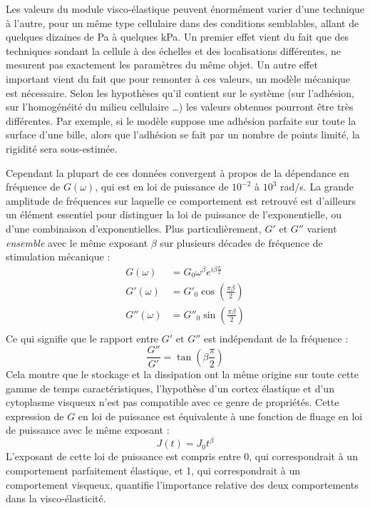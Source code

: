 \documentclass{report}
\begin{document}
Les valeurs du module visco-élastique peuvent énormément varier d'une technique à l'autre, pour un même type cellulaire dans des conditions semblables, allant de quelques dizaines de Pa à quelques kPa. 
Un premier effet vient du fait que des techniques sondant la cellule à des échelles et des localisations différentes, ne mesurent pas exactement les paramètres du même objet. 
Un autre effet important vient du fait que pour remonter à ces valeurs, un modèle mécanique est nécessaire. Selon les hypothèses qu'il contient sur le système (sur l'adhésion, sur l'homogénéité du milieu cellulaire \dots) les valeurs obtenues pourront être très différentes. 
Par exemple, si le modèle suppose une adhésion parfaite sur toute la surface d'une bille, alors que l'adhésion se fait par un nombre de points limité, la rigidité sera sous-estimée. 

Cependant la plupart de ces données convergent à propos de la dépendance en fréquence de $G(\omega)$, qui est en loi de puissance de $10^{-2}$ à $10^3$ rad/s. La grande amplitude de fréquences sur laquelle ce comportement est retrouvé est d'ailleurs un élément essentiel pour distinguer la loi de puissance de l'exponentielle, ou d'une combinaison d'exponentielles. Plus particulièrement, $G'$ et $G''$ varient \emph{ensemble} avec le même exposant $\beta$ sur plusieurs décades de fréquence de stimulation mécanique : 
\begin{align}
G(\omega)&=G_0 \omega^{\beta} e^{i \beta \frac{\pi}{2}} \\
G'(\omega)&=G'_0 \cos \left( \frac{\pi \beta}{2} \right) \\
G''( \omega)&=G''_0 \sin \left( \frac{\pi \beta}{2} \right) \\
\end{align} 
Ce qui signifie que le rapport entre $G'$ et $G''$ est indépendant de la fréquence : 
$$ \frac{G''}{G'} = \tan \left( \beta \frac{\pi}{2} \right)$$
Cela montre que le stockage et la dissipation ont la même origine sur toute cette gamme de temps caractéristiques, l'hypothèse d'un cortex élastique et d'un cytoplasme visqueux n'est pas compatible avec ce genre de propriétés. 
Cette expression de $G$ en loi de puissance est équivalente à une fonction de fluage en loi de puissance avec le même exposant : 
$$ J(t)= J_0 t^{\beta}$$
L'exposant de cette loi de puissance est compris entre 0, qui correspondrait à un comportement parfaitement élastique, et 1, qui correspondrait à un comportement visqueux, quantifie l'importance relative des deux comportements dans la visco-élasticité. 
\end{document}
